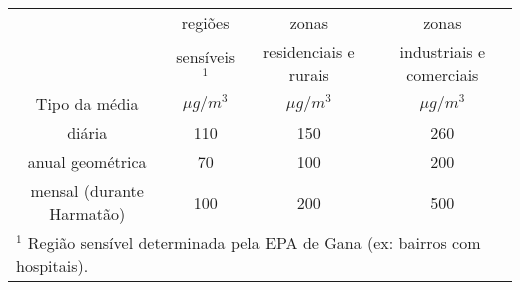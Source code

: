 \begin{tabular}{cccc}
\hline
                              &   regiões  &        zonas       &         zonas               \\
                              & sensíveis$^1$  & residenciais e rurais & industriais e comerciais      \\
Tipo da média                 & $\mu g/ m^3$ & $\mu g/ m^3$ & $\mu g/ m^3$      \\
\hline
diária                    & 110             & 150                      & 260         \\       
anual geométrica          & 70              & 100                      & 200                   \\
mensal (durante Harmatão) & 100             & 200                      & 500                     \\
\hline
\multicolumn{4}{l}{$^1$ Região sensível determinada pela EPA de Gana (ex: bairros com hospitais).} \\
\hline
\end{tabular}
